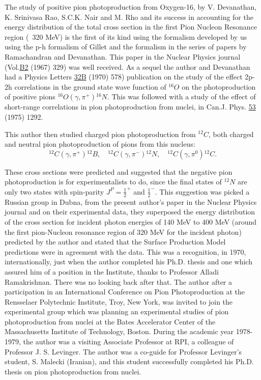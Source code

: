 The study of positive pion photoproduction from Oxygen-16, by V. Devanathan, K. Srinivasa Rao, S.C.K. Nair and M. Rho and its success in accounting for the energy distribution of the total cross section in the first Pion Nucleon Resonance region (~320 MeV) is the first of its kind using the formalism developed by us using the p-h formalism of Gillet and the formalism in the series of papers by Ramachandran and Devanathan. This paper in the Nuclear Physics journal (Vol.\underline{B2} (1967) 329) was well received. As a sequel the author and Devanathan had a Physics Letters \underline{32B} (1970) 578) publication on the study of the effect 2p-2h correlations in the ground state wave function of $^{16}O$ on the photoproduction of positive pions $^{16}O(\gamma, \pi^+){}^{16}N$. This was followed with a study of the effect of short-range correlations in pion photoproduction from nuclei, in Can.J. Phys. \underline{53} (1975) 1292.

This author then studied charged pion photoproduction from $^{12}C$, both charged and neutral pion photoproduction of pions from this nucleus:
$$
{}^{12}C(\gamma, \pi^+){}^{12}B, \quad  {}^{12}C(\gamma, \pi^-){}^{12}N, \quad 
{}^{12}C(\gamma, \pi^0){}^{12}C.
$$

These cross sections were predicted and suggested that the negative pion photoproduction is for experimentalists to do, since the final states of ${}^{12}N$ are only two states with spin-parity $J^P=\frac{1}{2}^+$ and $\frac{1}{2}^-$. This suggestion was picked a Russian group in Dubna, from the present author's paper in the Nuclear Physics journal and on their experimental data, they superposed the energy distribution of the cross section for incident photon energies of 140 MeV to 400 MeV (around the first pion-Nucleon resonance region of 320 MeV for the incident photon) predicted by the author and stated that the Surface Production Model predictions were in agreement with the data. This was a recognition, in 1970, internationally, just when the author completed his Ph.D. thesis and one which assured him of a position in the Institute, thanks to Professor Alladi Ramakrishnan. There was no looking back after that. The author after a participation in an International Conference on Pion Photoproduction at the Rensselaer Polytechnic Institute, Troy, New York, was invited to join the experimental group which was planning an experimental studies of pion photoproduction from nuclei at the Bates Accelerator Center of the Massachusetts Institute of Technology, Boston. During the academic year 1978-1979, the author was a visiting Associate Professor at RPI, a colleague of Professor J. S. Levinger. The author was a co-guide for Professor Levinger's student, S. Malecki (Iranian), and this student successfully completed his Ph.D. thesis on pion photoproduction from nuclei.

